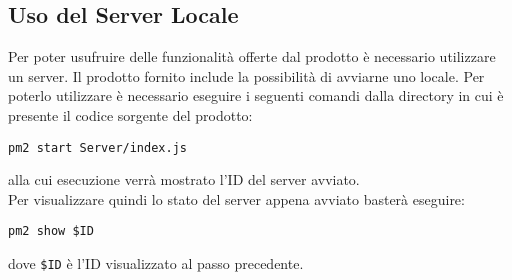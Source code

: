 \subsection{Uso del Server Locale}\label{Server}
Per poter usufruire delle funzionalità offerte dal prodotto è necessario utilizzare un server. Il prodotto fornito include la possibilità di avviarne uno locale. Per poterlo utilizzare è necessario eseguire i seguenti comandi dalla directory in cui è presente il codice sorgente del prodotto:
\begin{center}
	\texttt{pm2 start Server/index.js}
\end{center}
alla cui esecuzione verrà mostrato l'ID del server avviato.\\
Per visualizzare quindi lo stato del server appena avviato basterà eseguire:
\begin{center}
	\texttt{pm2 show \$ID}
\end{center}
dove \texttt{\$ID} è l'ID visualizzato al passo precedente.
